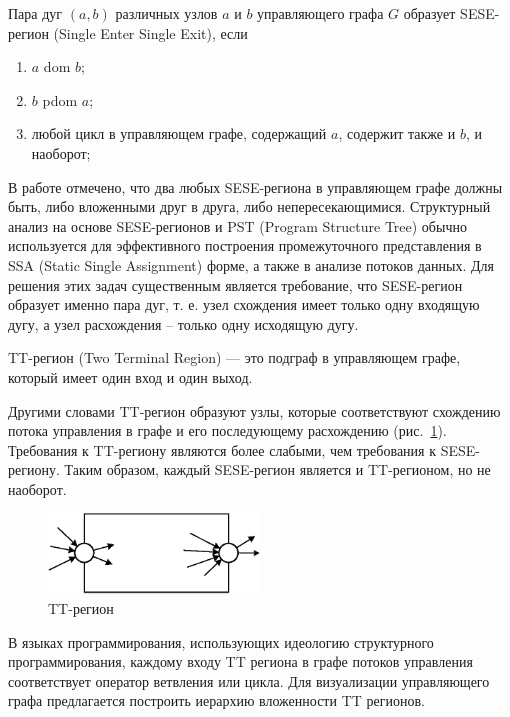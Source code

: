 \documentclass{jctart15a}
\begin{document}
\newtheorem{SESE}{Определение}[section]
\begin{Def}
	Пара дуг $(a, b)$ различных узлов $a$ и $b$ управляющего графа $G$ образует SESE-регион (Single Enter Single Exit), если
	\begin{enumerate}
		\item[1)]
			$a$ dom $b$;
		\item[2)]
			$b$ pdom $a$;
		\item[3)]
			любой цикл в управляющем графе, содержащий $a$, содержит также и $b$, и наоборот;
	\end{enumerate}
\end{Def}

В работе \cite{3} отмечено, что два любых SESE-региона в управляющем графе должны быть, либо вложенными друг в друга, либо непересекающимися. Структурный анализ на основе SESE-регионов и PST (Program Structure Tree) обычно используется для эффективного построения промежуточного представления в SSA (Static Single Assignment) форме, а также в анализе потоков данных. Для решения этих задач существенным является требование, что SESE-регион образует именно пара дуг, т. е. узел схождения имеет только одну входящую дугу, а узел расхождения -- только одну исходящую дугу.

\newtheorem{TT}{Определение}[section]
\begin{Def}
	TT-регион (Two Terminal Region) --- это подграф в управляющем графе, который имеет один вход и один выход.
\end{Def}

Другими словами TT-регион образуют узлы, которые соответствуют схождению  потока управления в графе и его последующему расхождению (рис.~\ref{fig:TTRegion}).
Требования к TT-региону являются более слабыми, чем требования к SESE-региону. Таким образом, каждый SESE-регион является и TT-регионом, но не наоборот.

\begin{figure}[htbp]
	\centering
		\includegraphics[width=0.5\textwidth]{Pic/TTRegion.eps}
	\caption{TT-регион}
	\label{fig:TTRegion}
\end{figure}

В языках программирования, использующих идеологию структурного программирования, каждому входу TT региона в графе потоков управления соответствует оператор ветвления или цикла. Для визуализации управляющего графа предлагается построить иерархию вложенности TT регионов.
\end{document}
